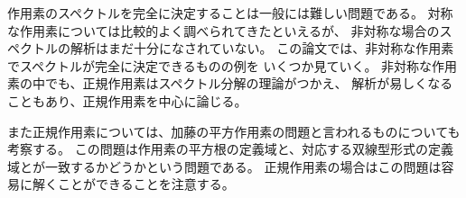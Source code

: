作用素のスペクトルを完全に決定することは一般には難しい問題である。
対称な作用素については比較的よく調べられてきたといえるが、
非対称な場合のスペクトルの解析はまだ十分になされていない。
この論文では、非対称な作用素でスペクトルが完全に決定できるものの例を
いくつか見ていく。
非対称な作用素の中でも、正規作用素はスペクトル分解の理論がつかえ、
解析が易しくなることもあり、正規作用素を中心に論じる。

また正規作用素については、加藤の平方作用素の問題と言われるものについても
考察する。
この問題は作用素の平方根の定義域と、対応する双線型形式の定義域とが一致するかどうかという問題である。
正規作用素の場合はこの問題は容易に解くことができることを注意する。
